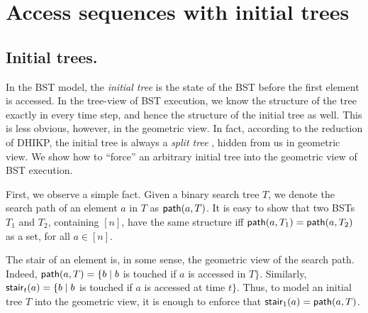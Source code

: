 
\section{Access sequences with initial trees} 
\label{sec:forbidden} 

\subsection{Initial trees.}
\label{sec:initial-tree}
In the BST model, the \emph{initial tree} is the state of the BST before the first element is accessed. In the tree-view of BST execution, we know the 
structure of the tree exactly in every time step, and hence the structure of
the initial tree as well. This is less obvious, however, in the geometric
view. In fact, according to the reduction of DHIKP, the
initial tree is always a \emph{split tree }\cite{DHIKP09}, hidden from us
in geometric view. We show how to ``force'' an arbitrary initial tree into the geometric view of BST execution.

First, we observe a simple fact. Given a binary search tree $T$, we
denote the search path of an element $a$ in $T$ as ${\sf path}(a,T)$. It is easy to show that two BSTs $T_{1}$ and $T_{2}$,
containing $[n]$, have the same structure iff ${\sf path}(a,T_{1})={\sf path}(a,T_{2})$
as a set, for all $a\in[n]$.


The stair of an element is, in some sense, the geometric view of the
search path. Indeed, ${\sf path}(a,T)=\{b\mid b$ is touched if $a$ is
accessed in $T\}$. Similarly, ${\sf stair}_t(a)=\{b\mid b$
is touched if $a$ is accessed at time $t\}$. Thus, to model an initial
tree $T$ into the geometric view, %
it is enough to enforce that ${\sf stair}_1(a)={\sf path}(a,T)$.

